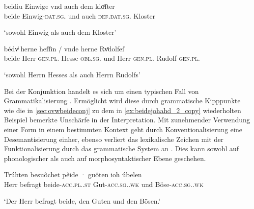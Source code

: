 \begin{exe}
\ex \label{ex:caoconjbeide}
	\begin{xlist}
	\ex \label{ex:caoconjbeide_1}
		\gll beidiu Einwige vnd auch dem kloͤſter \\
				beide Einwig-\textsc{dat.sg.\FemF} und auch
					\textsc{def.dat.sg.\NeutM} Kloster \\
		\begin{taggedline}{\parencites(Landshut, 1298)[\pno~2925, 219.34]{cao4}}
		\trans `sowohl Einwig als auch dem Kloster'
		\end{taggedline}

	\ex \label{ex:caoconjbeide_2}
		\gll bédvͥ herne heſſin / vnde herne Rvͦdolfeſ \\
			beide Herr-\textsc{gen.pl.\MascM} Hesse-\textsc{obl.sg.\MascM} {} und
				Herr-\textsc{gen.pl.\MascM} Rudolf-\textsc{gen.pl.\MascM} \\
		\begin{taggedline}{\parencites(Freiburg i.\,Br., 1290)[\pno~1318, 561.11--12]{cao2}}
		\trans `sowohl Herrn Hesses als auch Herrn Rudolfs'
		\end{taggedline}
	\end{xlist}
\end{exe}

Bei der Konjunktion  handelt es sich um einen typischen Fall von
Grammatikalisierung \autocite[vgl.][134--188]{lehmann2015}. Ermöglicht wird
diese durch grammatische Kipppunkte wie die in \cref{sec:ovwbeideconj} zu dem
in \cref{ex:beidejohahd_2_copy} wiederholten Beispiel bemerkte Unschärfe in der
Interpretation. Mit zunehmender Verwendung einer Form in einem bestimmten
Kontext geht durch Konventionalisierung eine Desemantisierung einher, ebenso
verliert das lexikalische Zeichen mit der Funktionalisierung durch das
grammatische System an . Dies kann sowohl auf phonologischer als
auch auf morphosyntaktischer Ebene geschehen.

\begin{exe}
\ex \label{ex:beidejohahd_2_copy}
	\gll Trúhten besuôchet pêide · guôten ioh
			úbelen \\
		Herr befragt beide-\textsc{acc.pl.\MascM.st} {}
			Gut-\textsc{acc.sg.\MascM.wk} und Böse-\textsc{acc.sg.\MascM.wk} \\
	\begin{taggedline}{\parencites(11.~Jh.)[Notker, Psalmen 10, 34--36: 395--401]{ddd}} %
	\trans `Der Herr befragt beide, den Guten und den Bösen.'
	\end{taggedline}
\end{exe}

